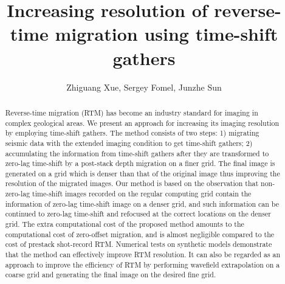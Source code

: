 \title{Increasing resolution of reverse-time migration using time-shift gathers}
\author{Zhiguang Xue, Sergey Fomel, Junzhe Sun}
\maketitle

\address{
Bureau of Economic Geology \\
John A. and Katherine G. Jackson School of Geosciences \\
The University of Texas at Austin \\
University Station, Box X \\
Austin, TX 78713-8924 \\
}



\begin{abstract}
	Reverse-time migration (RTM) has become an industry standard for imaging in complex geological areas.
	We present an approach for increasing its imaging resolution by employing time-shift gathers.
	The method consists of two steps: 1) migrating seismic data with the extended imaging condition to get time-shift gathers;
	2) accumulating the information from time-shift gathers
	after they are transformed to zero-lag time-shift by a post-stack depth migration on a finer grid.
	The final image is generated on a grid which is denser than that of the original image thus improving the resolution of the migrated images.
	Our method is based on the observation that non-zero-lag time-shift images recorded on the regular computing grid
	contain the information of zero-lag time-shift image on a denser grid, and such information
	can be continued to zero-lag time-shift and refocused at the correct locations on the denser grid.
	The extra computational cost of the proposed method amounts to the computational cost of zero-offset migration,
	and is almost negligible compared to the cost of prestack shot-record RTM.
	Numerical tests on synthetic models demonstrate that the method can effectively improve RTM resolution.
	It can also be regarded as an approach to improve the efficiency of RTM by performing wavefield extrapolation on a coarse grid and generating
	the final image on the desired fine grid.
\end{abstract}

